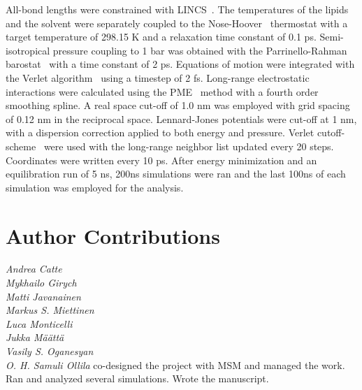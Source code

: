 \documentclass[pre,aps,floatfix,authordate1-4,twocolumn]{revtex4-1}
\begin{document}
All-bond lengths were constrained with LINCS~\cite{hess97,hess07}. The temperatures of the lipids and the solvent were separately coupled to the Nose-Hoover~\cite{nose84,hoover85} 
thermostat with a target temperature of 298.15 K and a relaxation time constant of 0.1 ps. Semi-isotropical pressure coupling to 1 bar was obtained 
with the Parrinello-Rahman barostat~\cite{parrinello81} with a time constant of 2 ps. Equations of motion were integrated with the Verlet algorithm~\cite{pall13} using a 
timestep of 2 fs. Long-range electrostatic interactions were calculated using the PME~\cite{darden93,essman95} method with a fourth order smoothing spline. 
A real space cut-off of 1.0 nm was employed with grid spacing of 0.12 nm in the reciprocal space. Lennard-Jones potentials were cut-off at 1 nm, 
with a dispersion correction applied to both energy and pressure. Verlet cutoff-scheme~\cite{pall13} were used with the long-range neighbor list updated 
every 20 steps. Coordinates were written every 10 ps. After energy minimization and an equilibration run of 5 ns, 200ns simulations were ran and 
the last 100ns of each simulation was employed for the analysis.



\section{Author Contributions}
\noindent 
{\it Andrea Catte} \\
{\it Mykhailo Girych} \\
{\it Matti Javanainen} \\
{\it Markus S. Miettinen} \\
{\it Luca Monticelli}  \\
{\it Jukka M{\"a}{\"a}tt{\"a}}  \\
{\it Vasily S. Oganesyan} \\
{\it O. H. Samuli Ollila} co-designed the project with MSM and managed the work. Ran and analyzed several simulations. Wrote the manuscript. \\


\onecolumngrid
\listoftodos



\end{document}
